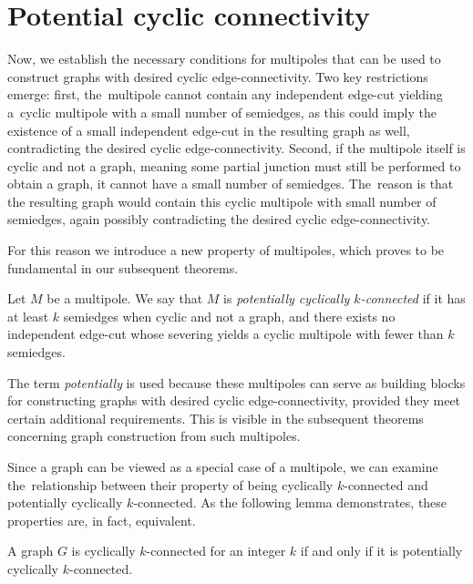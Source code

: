 \documentclass[12pt, twoside]{book}
\begin{document}
\section{Potential cyclic connectivity}\label{sec:potential-cyclic-connectivity}

Now, we establish the necessary conditions for multipoles that can be used to construct graphs with desired cyclic edge-connectivity. Two key restrictions emerge: first, the~multipole cannot contain any independent edge-cut yielding a~cyclic multipole with a small number of semiedges, as this could imply the existence of a small independent edge-cut in the resulting graph as well, contradicting the desired cyclic edge-connectivity. Second, if the multipole itself is cyclic and not a graph, meaning some partial junction must still be performed to obtain a graph, it cannot have a small number of semiedges. The~reason is that the resulting graph would contain this cyclic multipole with small number of semiedges, again possibly contradicting the desired cyclic edge-connectivity.

For this reason we introduce a new property of multipoles, which proves to be fundamental in our subsequent theorems.

\begin{definition}
	Let $M$ be a multipole. We say that $M$ is \textit{potentially cyclically \mbox{$k$-connected}} if it has at least $k$ semiedges when cyclic and not a graph, and there exists no independent edge-cut whose severing yields a cyclic multipole with fewer than $k$ semiedges.
\end{definition}

The term \textit{potentially} is used because these multipoles can serve as building blocks for constructing graphs with desired cyclic edge-connectivity, provided they meet certain additional requirements. This is visible in the subsequent theorems concerning graph construction from such multipoles.

Since a graph can be viewed as a special case of a multipole, we can examine the~relationship between their property of being cyclically $k$-connected and potentially cyclically $k$-connected. As the following lemma demonstrates, these properties are, in fact, equivalent.

\begin{lemma}\label{lem:graphs-potential-and-normal-cyclic-connected-eq}
	A graph $G$ is cyclically $k$-connected for an integer $k$ if and only if it is potentially cyclically \mbox{$k$-connected}.
\end{lemma}
\end{document}
